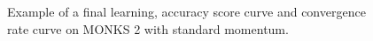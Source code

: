 \begin{appendices}
\begin{figure}[H]
\begin{subfigure}{0.40\textwidth}
                    \label{fig:monks_2_ACC_SGD}
                \end{subfigure}
                \begin{subfigure}{0.40\textwidth}
                    \caption{}
                    \label{fig:monks_2_NORM_SGD}
                \end{subfigure}
                \caption{Example of a final learning, accuracy score curve and
                convergence rate curve on MONKS 2 with standard momentum.}
                \label{fig:monks_2_SGD}
            \end{figure}


\end{appendices}
